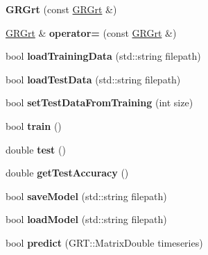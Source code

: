 \begin{DoxyCompactItemize}
\item 
\mbox{\label{classGRGrt_aa6510bae51d0f3d2c6af5ee3852cff38}} 
{\bfseries G\+R\+Grt} (const \mbox{\hyperlink{classGRGrt}{G\+R\+Grt}} \&)
\item 
\mbox{\label{classGRGrt_a89ff42babf977e9e602fed1a4927254a}} 
\mbox{\hyperlink{classGRGrt}{G\+R\+Grt}} \& {\bfseries operator=} (const \mbox{\hyperlink{classGRGrt}{G\+R\+Grt}} \&)
\item 
\mbox{\label{classGRGrt_a734acc0c43d8a1a326c8107f1b5d8ed3}} 
bool {\bfseries load\+Training\+Data} (std\+::string filepath)
\item 
\mbox{\label{classGRGrt_ac254a3cd3a2057665da563de0f763f87}} 
bool {\bfseries load\+Test\+Data} (std\+::string filepath)
\item 
\mbox{\label{classGRGrt_a9843133f434c214db226c4d5690113cb}} 
bool {\bfseries set\+Test\+Data\+From\+Training} (int size)
\item 
\mbox{\label{classGRGrt_a414538e216c5ab01569b11ddb27f3e16}} 
bool {\bfseries train} ()
\item 
\mbox{\label{classGRGrt_a274708474e42eab554bf5056da63c231}} 
double {\bfseries test} ()
\item 
\mbox{\label{classGRGrt_a1e78023522cece11f107d203ef3b1be7}} 
double {\bfseries get\+Test\+Accuracy} ()
\item 
\mbox{\label{classGRGrt_a20eb98bf5d0979c55cc4d91e1b191794}} 
bool {\bfseries save\+Model} (std\+::string filepath)
\item 
\mbox{\label{classGRGrt_a09f32336a2b089dadbf1c6e72ee55f2a}} 
bool {\bfseries load\+Model} (std\+::string filepath)
\item 
\mbox{\label{classGRGrt_ae1ec1de504ebc34eb3f7d553ca683584}} 
bool {\bfseries predict} (G\+R\+T\+::\+Matrix\+Double timeseries)
\item 
\mbox{\label{classGRGrt_a12807c23f6559c9b90d37b97fd07d07a}} 

\end{DoxyCompactItemize}
